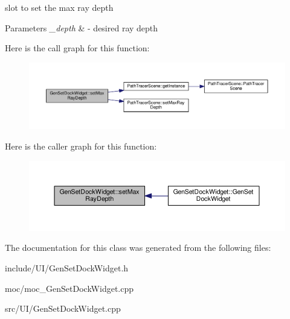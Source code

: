 slot to set the max ray depth 


\begin{DoxyParams}{Parameters}
{\em \-\_\-depth} & -\/ desired ray depth \\
\hline
\end{DoxyParams}


Here is the call graph for this function\-:
\nopagebreak
\begin{figure}[H]
\begin{center}
\leavevmode
\includegraphics[width=350pt]{class_gen_set_dock_widget_a1c26ee85a7c8734aa70472466f4777a7_cgraph}
\end{center}
\end{figure}




Here is the caller graph for this function\-:
\nopagebreak
\begin{figure}[H]
\begin{center}
\leavevmode
\includegraphics[width=350pt]{class_gen_set_dock_widget_a1c26ee85a7c8734aa70472466f4777a7_icgraph}
\end{center}
\end{figure}




The documentation for this class was generated from the following files\-:\begin{DoxyCompactItemize}
\item 
include/\-U\-I/Gen\-Set\-Dock\-Widget.\-h\item 
moc/moc\-\_\-\-Gen\-Set\-Dock\-Widget.\-cpp\item 
src/\-U\-I/Gen\-Set\-Dock\-Widget.\-cpp\end{DoxyCompactItemize}
